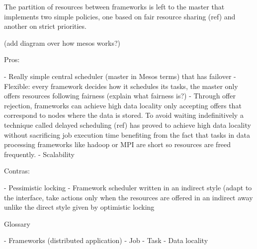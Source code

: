 The partition of resources between frameworks is left to the master
that implements two simple policies, one based on fair resource
sharing (ref) and another on strict priorities.

(add diagram over how mesos works?)


Pros:

- Really simple central scheduler (master in Mesos terms) that has
  failover 
- Flexible: every framework decides how it schedules its tasks, the
master only offers resources following fairness (explain what fairness is?)
- Through offer rejection, frameworks can achieve high data locality
only accepting offers that correspond to nodes where the data is
stored. To avoid waiting indefinitively a technique called delayed
scheduling (ref) has proved to achieve high data locality without
sacrificing job execution time benefiting from the fact that tasks in
data processing frameworks like hadoop or MPI are short so resources
are freed frequently.
- Scalability

Contras:

- Pessimistic locking
- Framework scheduler written in an indirect style (adapt to the interface, 
  take actions only when the resources are offered in an indirect away unlike
  the direct style given by optimistic locking



Glossary

- Frameworks (distributed application)
- Job
- Task
- Data locality
